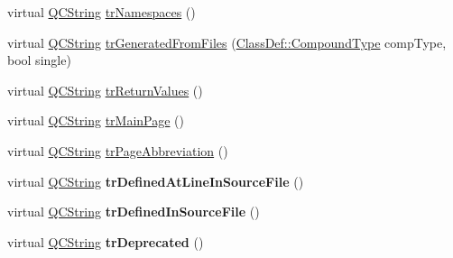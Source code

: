 \begin{DoxyCompactItemize}
\item 
virtual \hyperlink{class_q_c_string}{Q\-C\-String} \hyperlink{class_translator_swedish_ab509be45cc3774f62f622ccca0ea7e20}{tr\-Namespaces} ()
\item 
virtual \hyperlink{class_q_c_string}{Q\-C\-String} \hyperlink{class_translator_swedish_a597c39ad456b55dde01d47ad487a1c0b}{tr\-Generated\-From\-Files} (\hyperlink{class_class_def_a768a6f0a6fd7e9087ff7971abbcc3f36}{Class\-Def\-::\-Compound\-Type} comp\-Type, bool single)
\item 
virtual \hyperlink{class_q_c_string}{Q\-C\-String} \hyperlink{class_translator_swedish_a2b22c2ac68083d678d14769da085be63}{tr\-Return\-Values} ()
\item 
virtual \hyperlink{class_q_c_string}{Q\-C\-String} \hyperlink{class_translator_swedish_a5c25b54009116727430a4a63a1aaa8aa}{tr\-Main\-Page} ()
\item 
virtual \hyperlink{class_q_c_string}{Q\-C\-String} \hyperlink{class_translator_swedish_af558dc996edc81c3c7d2ebbc8c2a8c6b}{tr\-Page\-Abbreviation} ()
\item 
\hypertarget{class_translator_swedish_a974b1664d5a9d18448015bd37a7c9a35}{virtual \hyperlink{class_q_c_string}{Q\-C\-String} {\bfseries tr\-Defined\-At\-Line\-In\-Source\-File} ()}\label{class_translator_swedish_a974b1664d5a9d18448015bd37a7c9a35}

\item 
\hypertarget{class_translator_swedish_a00308e5fb2cfca820b234e0d7ab374ce}{virtual \hyperlink{class_q_c_string}{Q\-C\-String} {\bfseries tr\-Defined\-In\-Source\-File} ()}\label{class_translator_swedish_a00308e5fb2cfca820b234e0d7ab374ce}

\item 
\hypertarget{class_translator_swedish_afb3b9c411a30f4ac2c49021ed318ecd4}{virtual \hyperlink{class_q_c_string}{Q\-C\-String} {\bfseries tr\-Deprecated} ()}\label{class_translator_swedish_afb3b9c411a30f4ac2c49021ed318ecd4}


\end{DoxyCompactItemize}
